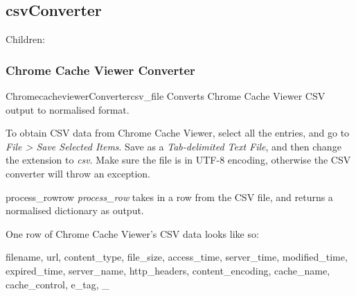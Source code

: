 \documentclass[letterpaper,10pt,english]{manual}
\begin{document}
\resetcurrentobjects
\hypertarget{--doc-csvConverter}{}

\subsection{csvConverter}

Children:

\resetcurrentobjects
\hypertarget{--doc-chromecacheviewer}{}

\subsubsection{Chrome Cache Viewer Converter}
\hypertarget{module-webscavator.converters.chromecacheviewer}{}
\modulesynopsis{}

\hypertarget{webscavator.converters.chromecacheviewer.ChromecacheviewerConverter}{}\begin{classdesc}{ChromecacheviewerConverter}{csv\_file}
Converts Chrome Cache Viewer CSV output to normalised format.

To obtain CSV data from Chrome Cache Viewer, select all the entries, and go to \emph{File \textgreater{}
Save Selected Items}. Save as a \emph{Tab-delimited Text File}, and then change the extension to 
\emph{csv}. Make sure the file is in UTF-8 encoding, otherwise the CSV converter will throw
an exception.

\hypertarget{webscavator.converters.chromecacheviewer.ChromecacheviewerConverter.process_row}{}\begin{methoddesc}{process\_row}{row}
\emph{process\_row} takes in a row from the CSV file, and returns a normalised dictionary as output.

One row of Chrome Cache Viewer's CSV data looks like so:

filename, url, content\_type, file\_size, access\_time, server\_time, modified\_time, expired\_time, 
server\_name, http\_headers, content\_encoding, cache\_name, cache\_control, e\_tag, \_
\end{methoddesc}
\end{classdesc}

\resetcurrentobjects
\hypertarget{--doc-foxanalysis}{}
\end{document}
